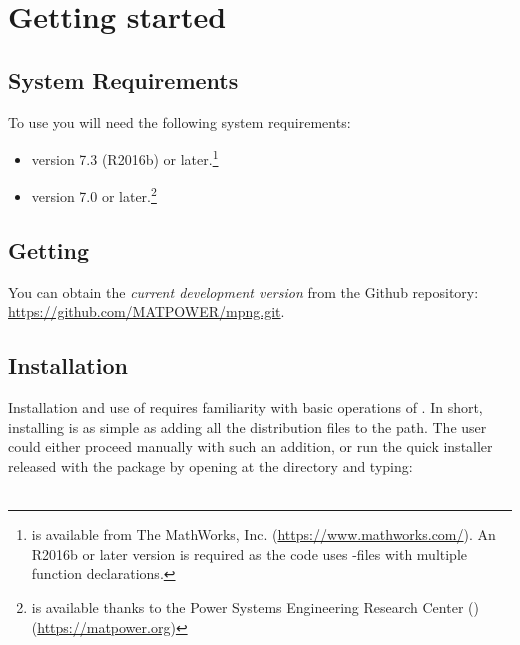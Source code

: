 \chapter{Getting started}
\label{chap:get_started}

\section{System Requirements}
\label{sec:requirements}

To use \mpng{} you will need the following system requirements:

\begin{itemize}
	\item[\checkmark] \matlab{}\textsuperscript{\tiny \textregistered} version 7.3 (R2016b) or later.\footnote{\matlab{} is available from The MathWorks, Inc. (\url{https://www.mathworks.com/}). An R2016b or later \matlab{} version is required as the \mpng{} code uses \matlab{}-files with multiple function declarations.}
	
	\item[\checkmark] \matpower{} version 7.0 or later.\footnote{\matpower{} is available thanks to the Power Systems Engineering Research Center (\pserc) (\url{https://matpower.org})}
\end{itemize}

\section{Getting \mpng{}}
\label{sec:get_mpng}

You can obtain the \emph{current development version} from the \matpower{} Github repository: \url{https://github.com/MATPOWER/mpng.git}.

\section{Installation}
\label{sec:install}

Installation and use of \mpng{} requires familiarity with basic operations of \matlab{}. In short, installing \mpng{} is as simple as adding all the distribution files to the \matlab{} path. The user could either proceed manually with such an addition, or run the quick installer released with the package by opening \matlab{} at the \mpngpath{} directory and typing:\\

\\

